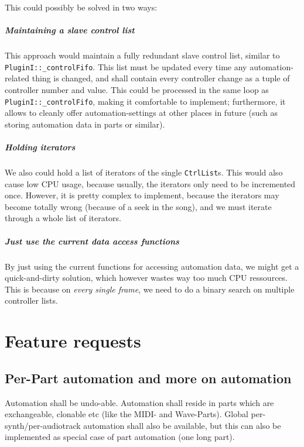 \documentclass[a4paper]{report}
\begin{document}
This could possibly be solved in two ways:
\paragraph{Maintaining a slave control list}
This approach would maintain a fully redundant slave control list,
similar to \texttt{PluginI::\_controlFifo}. This list must be updated
every time any automation-related thing is changed, and shall contain
every controller change as a tuple of controller number and value.
This could be processed in the same loop as \texttt{PluginI::\_controlFifo},
making it comfortable to implement; furthermore, it allows to cleanly
offer automation-settings at other places in future (such as storing
automation data in parts or similar).

\paragraph{Holding iterators}
We also could hold a list of iterators of the single \texttt{CtrlList}s.
This would also cause low CPU usage, because usually, the iterators only
need to be incremented once. However, it is pretty complex to implement,
because the iterators may become totally wrong (because of a seek in the
song), and we must iterate through a whole list of iterators.

\paragraph{Just use the current data access functions}
By just using the current functions for accessing automation data,
we might get a quick-and-dirty solution, which however wastes way too
much CPU ressources. This is because on \emph{every single frame}, we
need to do a binary search on multiple controller lists.


\chapter{Feature requests}
\section{Per-Part automation and more on automation}                       %
Automation shall be undo-able. Automation shall reside in parts which
are exchangeable, clonable etc (like the MIDI- and Wave-Parts).
Global per-synth/per-audiotrack automation shall also be available, but
this can also be implemented as special case of part automation (one
long part).
\end{document}
